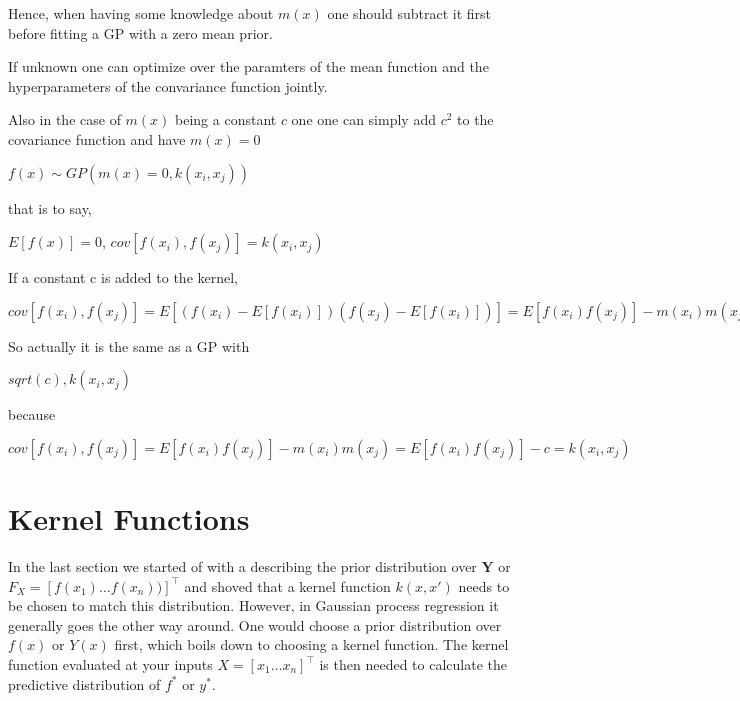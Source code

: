Hence, when
having some knowledge about $m(x)$ one should subtract it first before fitting a GP
with a zero mean prior.

If unknown one can optimize over the paramters of the mean function and the hyperparameters
of the convariance function jointly.

Also in the case of $m(x)$ being a constant $c$ one one can simply add $c^2$ to the covariance function
and have $m(x) =0$

$f(x) \sim GP(m(x)=0, k(x_i, x_j))$

that is to say,

$E[f(x)] = 0$, $cov[f(x_i), f(x_j)] = k(x_i, x_j)$

If a constant c is added to the kernel,

    $cov[f(x_i), f(x_j)] = E[(f(x_i) - E[f(x_i)])(f(x_j) -E[f(x_i)])]= E[f(x_i)f(x_j)] - m(x_i)m(x_j) = E[f(x_i)f(x_j)] = k(x_i, x_j) + c$

So actually it is the same as a GP with

    $sqrt(c), k(x_i, x_j)$

because

    $cov[f(x_i), f(x_j)] = E[f(x_i)f(x_j)] - m(x_i)m(x_j) = E[f(x_i)f(x_j)] - c = k(x_i, x_j)$





\section{Kernel Functions}\label{subsec:kernel}

In the last section we started of with a describing the prior distribution over
$\mathbf{Y}$ or $F_X = [f(x_1) \dots f(x_n))]^{\top}$ and shoved that a kernel function $k(x, x')$ needs to be
chosen to match this distribution.
However, in Gaussian process regression it generally goes the other way around.
One would choose a prior distribution over $f(x)$ or $Y(x)$ first, which boils down to choosing a kernel function.
The kernel function evaluated at your inputs $X=[x_1 \dots x_n]^{\top}$ is then needed to calculate the
predictive distribution of $f^{\ast}$ or $y^{\ast}$.


